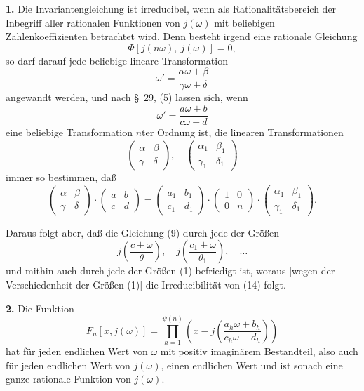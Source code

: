\documentclass[12pt,a4paper]{article}
\theoremstyle{definition}
\begin{document}
\textbf{1.} Die Invariantengleichung ist irreducibel, wenn als Rationalitätsbereich der Inbegriff aller rationalen Funktionen von $j(\omega)$ mit beliebigen Zahlenkoeffizienten betrachtet wird. Denn besteht irgend eine rationale Gleichung
\begin{equation}\label{eq:69-15}
\Phi[j(n\omega),\ j(\omega)] = 0,
\end{equation}
so darf darauf jede beliebige lineare Transformation
\[
\omega' = \frac{\alpha\omega + \beta}{\gamma\omega + \delta}
\]
angewandt werden, und nach \S\ 29, (5) lassen sich, wenn
\[
\omega' = \frac{a\omega + b}{c\omega + d}
\]
eine beliebige Transformation $n$ter Ordnung ist, die linearen Transformationen
\[
\begin{pmatrix} \alpha & \beta \\ \gamma & \delta \end{pmatrix}, \quad \begin{pmatrix} \alpha_1 & \beta_1 \\ \gamma_1 & \delta_1 \end{pmatrix}
\]
immer so bestimmen, daß
\[
\begin{pmatrix} \alpha & \beta \\ \gamma & \delta \end{pmatrix} \cdot \begin{pmatrix} a & b \\ c & d \end{pmatrix} = \begin{pmatrix} a_1 & b_1 \\ c_1 & d_1 \end{pmatrix} \cdot \begin{pmatrix} 1 & 0 \\ 0 & n \end{pmatrix} \cdot \begin{pmatrix} \alpha_1 & \beta_1 \\ \gamma_1 & \delta_1 \end{pmatrix}.
\]

Daraus folgt aber, daß die Gleichung (9) durch jede der Größen
\[
j\left(\frac{c + \omega}{\theta}\right), \quad j\left(\frac{c_1 + \omega}{\theta_1}\right), \quad \ldots
\]
und mithin auch durch jede der Größen (1) befriedigt ist, woraus [wegen der Verschiedenheit der Größen (1)] die Irreducibilität von (14) folgt.

\textbf{2.} Die Funktion
\begin{equation}\label{eq:69-17}
F_n[x, j(\omega)] = \prod_{h=1}^{\psi(n)} \left(x - j\left(\frac{a_h \omega + b_h}{c_h \omega + d_h}\right)\right)
\end{equation}
hat für jeden endlichen Wert von $\omega$ mit positiv imaginärem Bestandteil, also auch für jeden endlichen Wert von $j(\omega)$, einen endlichen Wert und ist sonach eine ganze rationale Funktion von $j(\omega)$.
\end{document}
